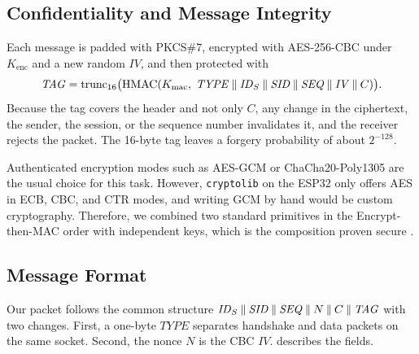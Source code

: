 \documentclass[11pt,a4paper]{article}
\begin{document}
\subsection{Confidentiality and Message Integrity}

Each message is padded with PKCS\#7, encrypted with AES-256-CBC under
$K_{\mathrm{enc}}$ and a new random $\mathit{IV}$, and then protected with
\begin{equation}
    \mathit{TAG} = \mathrm{trunc}_{16}\big(\mathrm{HMAC}(K_{\mathrm{mac}},\;
    \mathit{TYPE} \mathbin\Vert \mathit{ID}_S \mathbin\Vert \mathit{SID} \mathbin\Vert \mathit{SEQ}
    \mathbin\Vert \mathit{IV} \mathbin\Vert C)\big).
    \label{eq:tag}
\end{equation}
Because the tag covers the header and not only $C$, any change in the
ciphertext, the sender, the session, or the sequence number invalidates it, and
the receiver rejects the packet. The 16-byte tag leaves a forgery probability
of about $2^{-128}$.

Authenticated encryption modes such as AES-GCM or ChaCha20-Poly1305 are the
usual choice for this task. However, \texttt{cryptolib} on the ESP32 only offers AES in ECB, CBC, and CTR modes, and writing GCM by hand
would be custom cryptography. Therefore, we combined two standard primitives in
the Encrypt-then-MAC order with independent keys, which is the composition
proven secure \cite{katz2020introduction}.

\subsection{Message Format}

Our packet follows the common structure
$\mathit{ID}_S \mathbin\Vert \mathit{SID} \mathbin\Vert \mathit{SEQ} \mathbin\Vert N \mathbin\Vert C \mathbin\Vert \mathit{TAG}$
with two changes. First, a
one-byte $\mathit{TYPE}$ separates handshake and data packets on the same
socket. Second, the nonce $N$ is the CBC $\mathit{IV}$. 
describes the fields.
\end{document}
